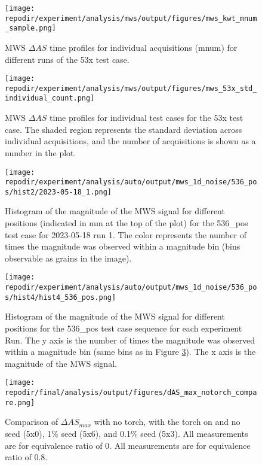 \begin{figure}
    \centering
    \texttt{[image: \\repodir/experiment/analysis/mws/output/figures/mws\_kwt\_mnum\_sample.png]} 
    \caption{MWS $\Delta AS$ time profiles for individual acquisitions (mnum) for different runs of the 53x test case.  }
    \label{fig:SI_mws_kwt_mnum_sample}
\end{figure}

\begin{figure}
    \centering
    \texttt{[image: \\repodir/experiment/analysis/mws/output/figures/mws\_53x\_std\_individual\_count.png]} 
    \caption{MWS $\Delta AS$ time profiles for individual test cases for the 53x test case. The shaded region represents the standard deviation across individual acquisitions, and the number of acquisitions is shown as a number in the plot.}
    \label{fig:SI_mws_53x_std_individual_count}
\end{figure}

\begin{figure}
    \centering
    \texttt{[image: \\repodir/experiment/analysis/auto/output/mws\_1d\_noise/536\_pos/hist2/2023-05-18\_1.png]} 
    \caption{Histogram of the magnitude of the MWS signal for different positions (indicated in mm at the top of the plot) for the 536\_pos test case for 2023-05-18 run 1. The color represents the number of times the magnitude was observed within a magnitude bin (bins observable as grains in the image). }
    \label{fig:SI_mws_1d_noise_536_pos_hist2_2023-05-18_1}
\end{figure}

\begin{figure}
    \centering
    \texttt{[image: \\repodir/experiment/analysis/auto/output/mws\_1d\_noise/536\_pos/hist4/hist4\_536\_pos.png]} 
    \caption{Histogram of the magnitude of the MWS signal for different positions for the 536\_pos test case sequence for each experiment Run. The y axis is the number of times the magnitude was observed within a magnitude bin (same bins as in Figure \ref{fig:SI_mws_1d_noise_536_pos_hist2_2023-05-18_1}). The x axis is the magnitude of the MWS signal.}
    \label{fig:SI_mws_1d_noise_536_pos_hist4_hist4_536_pos}
\end{figure}

\begin{figure}[]
\centering
\texttt{[image: \\repodir/final/analysis/output/figures/dAS\_max\_notorch\_compare.png]}
\caption{Comparison of $\Delta AS_{max}$ with no torch, with the torch on and no seed (5x0), 1\% seed (5x6), and 0.1\% seed (5x3). All measurements are for equivalence ratio of 0. All measurements are for equivalence ratio of 0.8.}
\end{figure}

